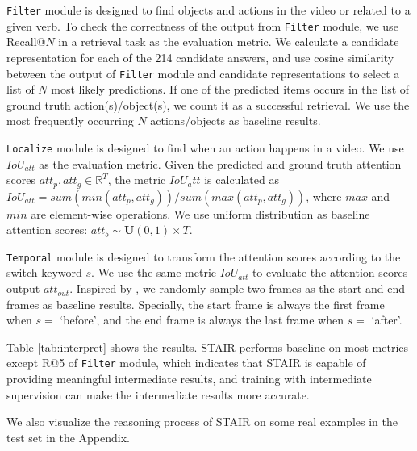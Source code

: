 \documentclass[letterpaper]{article} %
\begin{document}
\texttt{Filter} module is designed to find objects and actions in the video or related to a given verb. To check the correctness of the output from \texttt{Filter} module, we use Recall@$N$ in a retrieval task as the evaluation metric. We calculate a candidate representation for each of the 214 candidate answers, and use cosine similarity between the output of \texttt{Filter} module and candidate representations to select a list of $N$ most likely predictions. If one of the predicted items occurs in the list of ground truth action(s)/object(s), we count it as a successful retrieval. We use the most frequently occurring $N$ actions/objects as baseline results.

\texttt{Localize} module is designed to find when an action happens in a video. We use $IoU_{att}$ as the evaluation metric. Given the predicted and ground truth attention scores $att_{p}, att_{g} \in \mathbb{R}^T$, the metric $IoU_att$ is calculated as $IoU_{att}=sum(min(att_{p}, att_{g})) / sum(max(att_{p}, att_{g}))$, where $max$ and $min$ are element-wise operations. We use uniform distribution as baseline attention scores: $att_{b} \sim \mathbf{U}(0,1) \times T$.

\texttt{Temporal} module is designed to transform the attention scores according to the switch keyword $s$. We use the same metric $IoU_{att}$ to evaluate the attention scores output $att_{out}$. Inspired by \cite{Qian2022DynamicSM}, we randomly sample two frames as the start and end frames as baseline results. Specially, the start frame is always the first frame when $s=$ `before', and the end frame is always the last frame when $s=$ `after'.

Table \ref{tab:interpret} shows the results. STAIR performs baseline on most metrics except R@5 of \texttt{Filter} module, which indicates that STAIR is capable of providing meaningful intermediate results, and training with intermediate supervision can make the intermediate results more accurate.


We also visualize the reasoning process of STAIR on some real examples in the test set in the Appendix.
\end{document}
